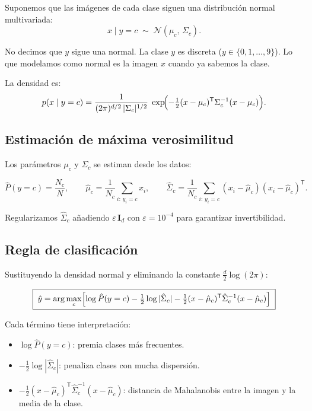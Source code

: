 \documentclass[11pt,a4paper]{article}
\begin{document}
Suponemos que las im\'agenes de cada clase siguen una distribuci\'on normal
multivariada:
\[
  x\mid y=c \;\sim\; \mathcal{N}(\mu_c,\,\Sigma_c).
\]

No decimos que $y$ sigue una normal. La clase $y$ es discreta
($y\in\{0,1,\dots,9\}$). Lo que modelamos como normal es la imagen $x$
cuando ya sabemos la clase.

La densidad es:
\[
  p(x\mid y=c) = \frac{1}{(2\pi)^{d/2}\,|\Sigma_c|^{1/2}}\;
  \exp\!\Bigl(-\tfrac{1}{2}(x-\mu_c)^{\mathsf{T}}
  \Sigma_c^{-1}(x-\mu_c)\Bigr).
\]

\subsection{Estimaci\'on de m\'axima verosimilitud}

Los par\'ametros $\mu_c$ y $\Sigma_c$ se estiman desde los datos:

\[
  \hat{P}(y=c) = \frac{N_c}{N}, \qquad
  \hat{\mu}_c = \frac{1}{N_c}\sum_{i:\,y_i=c} x_i, \qquad
  \hat{\Sigma}_c = \frac{1}{N_c}\sum_{i:\,y_i=c}
    (x_i-\hat{\mu}_c)(x_i-\hat{\mu}_c)^{\mathsf{T}}.
\]

Regularizamos $\hat{\Sigma}_c$ a\~nadiendo $\varepsilon\,\mathbf{I}_d$ con
$\varepsilon=10^{-4}$ para garantizar invertibilidad.

\subsection{Regla de clasificaci\'on}

Sustituyendo la densidad normal y eliminando la constante
$\frac{d}{2}\log(2\pi)$:

\[
  \boxed{\;\hat{y} = \arg\max_c \Bigl[
    \log \hat{P}(y=c)
    - \tfrac{1}{2}\log|\hat{\Sigma}_c|
    - \tfrac{1}{2}(x-\hat{\mu}_c)^{\mathsf{T}}
      \hat{\Sigma}_c^{-1}(x-\hat{\mu}_c)
  \Bigr]\;}
\]

Cada t\'ermino tiene interpretaci\'on:
\begin{itemize}
  \item $\log \hat{P}(y=c)$: premia clases m\'as frecuentes.
  \item $-\frac{1}{2}\log|\hat{\Sigma}_c|$: penaliza clases con mucha
        dispersi\'on.
  \item $-\frac{1}{2}(x-\hat{\mu}_c)^{\mathsf{T}}\hat{\Sigma}_c^{-1}
         (x-\hat{\mu}_c)$: distancia de Mahalanobis entre la imagen y la
         media de la clase.
\end{itemize}
\end{document}
